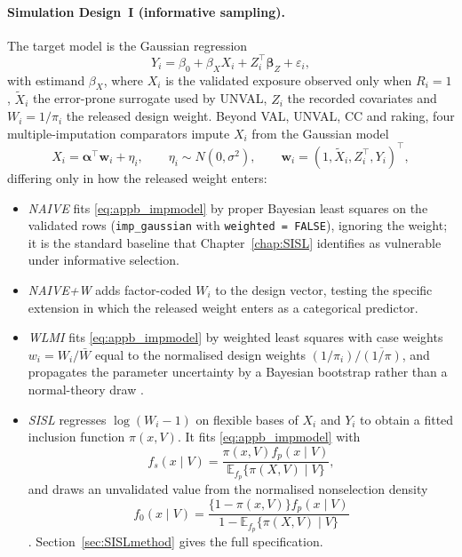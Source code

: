 \paragraph{Simulation Design~I (informative sampling).} The target model is the Gaussian regression
\begin{equation}
\label{eq:appb_analysis}
Y_i = \beta_0 + \beta_X X_i + Z_i^{\top}\boldsymbol{\beta}_Z + \varepsilon_i ,
\end{equation}
with estimand $\beta_X$, where $X_i$ is the validated exposure observed only when $R_i = 1$, $\tilde{X}_i$ the error-prone surrogate used by UNVAL, $Z_i$ the recorded covariates and $W_i = 1/\pi_i$ the released design weight. Beyond VAL, UNVAL, CC and raking, four multiple-imputation comparators impute $X_i$ from the Gaussian model
\begin{equation}
\label{eq:appb_impmodel}
X_i = \boldsymbol{\alpha}^{\top}\mathbf{w}_i + \eta_i , \qquad \eta_i \sim N(0, \sigma^2), \qquad \mathbf{w}_i = (1, \tilde{X}_i, Z_i^{\top}, Y_i)^{\top},
\end{equation}
differing only in how the released weight enters:
\begin{itemize}
\item \emph{NAIVE} fits \eqref{eq:appb_impmodel} by proper Bayesian least squares on the validated rows (\texttt{imp\_gaussian} with \texttt{weighted = FALSE}), ignoring the weight; it is the standard baseline that Chapter~\ref{chap:SISL} identifies as vulnerable under informative selection.
\item \emph{NAIVE+W} adds factor-coded $W_i$ to the design vector, testing the specific extension in which the released weight enters as a categorical predictor.
\item \emph{WLMI} fits \eqref{eq:appb_impmodel} by weighted least squares with case weights $w_i = W_i/\bar{W}$ equal to the normalised design weights $(1/\pi_i)/\overline{(1/\pi)}$, and propagates the parameter uncertainty by a Bayesian bootstrap rather than a normal-theory draw \citep{Rubin1987, bartlett2020bootstrap}.
\item \emph{SISL} regresses $\log(W_i - 1)$ on flexible bases of $X_i$ and $Y_i$ to obtain a fitted inclusion function $\pi(x,V)$. It fits \eqref{eq:appb_impmodel} with
\[
f_s(x\mid V)=\frac{\pi(x,V)f_p(x\mid V)}{\mathbb E_{f_p}\{\pi(X,V)\mid V\}},
\]
and draws an unvalidated value from the normalised nonselection density
\[
f_0(x\mid V)=\frac{\{1-\pi(x,V)\}f_p(x\mid V)}{1-\mathbb E_{f_p}\{\pi(X,V)\mid V\}}
\]
\citep{pfeffermann1999parametric}. Section~\ref{sec:SISLmethod} gives the full specification.
\end{itemize}

